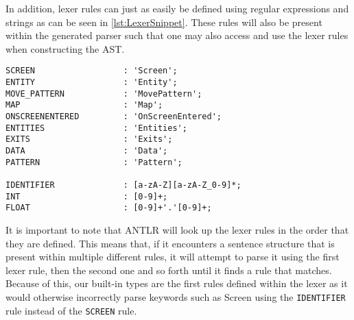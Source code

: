 In addition, lexer rules can just as easily be defined using regular expressions and strings as can be seen in \ref{lst:LexerSnippet}.
These rules will also be present within the generated parser such that one may also access and use the lexer rules when constructing the AST. 

\begin{lstlisting}[caption={A snippet of few lexer rules for \dazel{}.}, label={lst:LexerSnippet},escapechar=|]
SCREEN                  : 'Screen';
ENTITY                  : 'Entity';
MOVE_PATTERN            : 'MovePattern';
MAP                     : 'Map';
ONSCREENENTERED         : 'OnScreenEntered';
ENTITIES                : 'Entities';
EXITS                   : 'Exits';
DATA                    : 'Data';
PATTERN                 : 'Pattern';

IDENTIFIER              : [a-zA-Z][a-zA-Z_0-9]*;
INT                     : [0-9]+;
FLOAT                   : [0-9]+'.'[0-9]+;	
\end{lstlisting}

It is important to note that ANTLR will look up the lexer rules in the order that they are defined. 
This means that, if it encounters a sentence structure that is present within multiple different rules, it will attempt to parse it using the first lexer rule, then the second one and so forth until it finds a rule that matches. 
Because of this, our built-in types are the first rules defined within the lexer as it would otherwise incorrectly parse keywords such as Screen using the \texttt{IDENTIFIER} rule instead of the \texttt{SCREEN} rule\cite{parrDefinitiveANTLRReference2012}.
